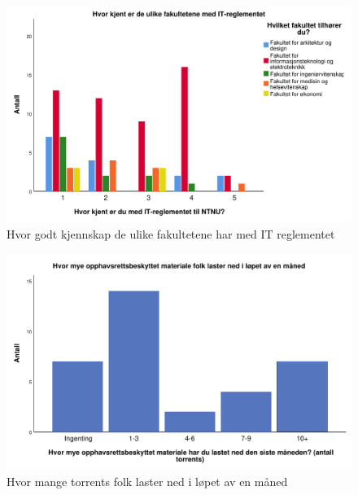 \begin{figure}[H]
    \centering
    \includegraphics[scale=0.45]{case_1/bilder/reglement_fakultet.pdf}
    \caption[Forskjellen mellom fakultetene og kjennskap til IT reglement]{Hvor godt kjennskap de ulike fakultetene har med IT reglementet}
    \label{fig:reglement-fakultet}
\end{figure}

\begin{figure}[H]
    \centering
    \includegraphics[scale=0.45]{case_1/bilder/antalltorrents.pdf}
    \caption[Antall torrents som blir lastet ned hver måned]{Hvor mange torrents folk laster ned i løpet av en måned}
    \label{fig:antalltorrents}
\end{figure}

